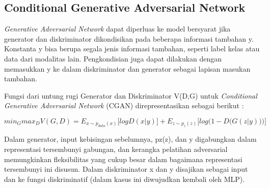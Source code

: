 \subsection{Conditional Generative Adversarial Network}
\label{subsec:conditionalGAN}

\emph{Generative Adversarial Network} dapat diperluas ke model bersyarat jika generator dan diskriminator dikondisikan pada beberapa informasi tambahan y. 
Konstanta y bisa berupa segala jenis informasi tambahan, seperti label kelas atau data dari modalitas lain. 
Pengkondisian juga dapat dilakukan dengan memasukkan y ke dalam diskriminator dan generator sebagai lapisan masukan tambahan.

Fungsi dari untung rugi Generator dan Diskriminator V(D,G) untuk \emph{Conditional Generative Adversarial Network} (CGAN) direpresentasikan sebagai berikut :

\begin{equation}
  \label{eq:CGAN}
  min_{G} max_{D} V(G,D) =  E_{x \sim p_{data} (x)} \big[ log D(x|y) \big] + E_{z \sim p_{z} (z)} \big[ log  \big(1-D \big(G(z|y)\big) \big) \big]
\end{equation}

Dalam generator, input kebisingan sebelumnya, pz(z), dan y digabungkan dalam representasi tersembunyi gabungan, dan kerangka pelatihan adversarial memungkinkan fleksibilitas yang cukup besar dalam bagaimana representasi tersembunyi ini disusun. 
Dalam diskriminator x dan y disajikan sebagai input dan ke fungsi diskriminatif (dalam kasus ini diwujudkan kembali oleh MLP). \parencite{CGAN}
